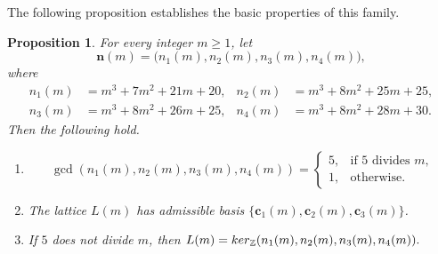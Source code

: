\documentclass[10pt,a4paper]{amsart}
\newtheorem{proposition}[theorem]{Proposition}
\begin{document}
The following proposition establishes the basic properties of this
family.

\begin{proposition}\label{prop:family}
For every integer $m\ge1$, let
\[
\mathbf n(m)=
\bigl(n_1(m),n_2(m),n_3(m),n_4(m)\bigr),
\]
where
\[
\begin{aligned}
n_1(m)&=m^3+7m^2+21m+20, &
n_2(m)&=m^3+8m^2+25m+25,\\
n_3(m)&=m^3+8m^2+26m+25, &
n_4(m)&=m^3+8m^2+28m+30.
\end{aligned}
\]
Then the following hold.

\begin{enumerate}
\item[\textup{(i)}]
\[
\gcd(n_1(m),n_2(m),n_3(m),n_4(m))
=
\begin{cases}
5,&\text{if $5$ divides $m$,}\\
1,&\text{otherwise.}
\end{cases}
\]

\item[\textup{(ii)}]
The lattice $L(m)$ has admissible basis
$\{\mathbf c_1(m),\mathbf c_2(m),\mathbf c_3(m)\}$.

\item[\textup{(iii)}]
If $5$ does not divide $m$, then $
L(m)={\rm ker}_{\mathbb Z}(n_{1}(m),n_{2}(m),n_{3}(m),n_{4}(m)).$
\end{enumerate}
\end{proposition}
\end{document}
